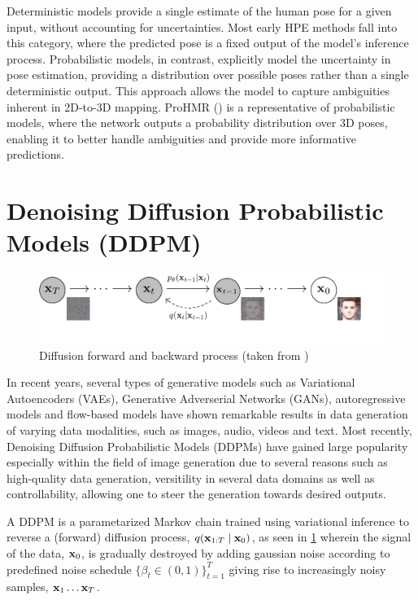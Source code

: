 Deterministic models provide a single estimate of the human pose for a given input, without accounting for uncertainties. Most early HPE methods fall into this category, where the predicted 
pose is a fixed output of the model's inference process.
Probabilistic models, in contrast, explicitly model the uncertainty in pose estimation, providing a distribution over possible poses rather than a single deterministic output. This approach allows the model to capture ambiguities inherent in 2D-to-3D mapping. ProHMR (\cite{kolotouros2021prohmr}) is a representative of probabilistic models, where the network outputs a probability distribution over 3D poses, enabling it to better handle ambiguities and provide more informative predictions.


\section{Denoising Diffusion Probabilistic Models (DDPM)}
\begin{figure}[H]
    \centering
    \includegraphics[width=\linewidth]{figures/pgm_diagram_xarrow_small.pdf}
    \caption{Diffusion forward and backward process (taken from \cite{ho2020denoising})}
    \label{fig:diffusion-process}
\end{figure}
In recent years, several types of generative models such as Variational Autoencoders (VAEs), Generative Adverserial Networks (GANs), autoregressive models and flow-based models have shown remarkable results in data generation of varying data modalities, such as images, audio, videos and text. Most recently, Denoising Diffusion Probabilistic Models (DDPMs) have gained large popularity especially within the field of image generation due to several reasons such as high-quality data generation, versitility in several data domains as well as controllability, allowing one to steer the generation towards desired outputs.

A DDPM is a parametarized Markov chain trained using variational inference to reverse a (forward) diffusion process, $q(\boldsymbol{\mathbf{x}}_{1:T} \mid \boldsymbol{\mathbf{x}}_0)$, as seen in \cref{fig:diffusion-process} wherein the signal of the data, $\boldsymbol{\mathbf{x}}_0$, is gradually destroyed by adding gaussian noise according to predefined noise schedule $\{\beta_t  \in (0,1) \}_{t=1}^T$ giving rise to increasingly noisy samples, $\boldsymbol{\mathbf{x}}_1 \ldots \boldsymbol{\mathbf{x}}_T$. 

